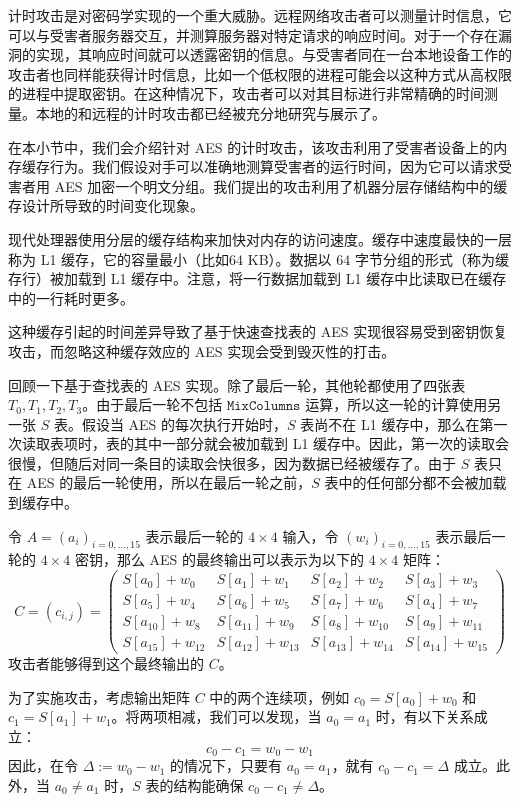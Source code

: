 计时攻击是对密码学实现的一个重大威胁。远程网络攻击者可以测量计时信息，它可以与受害者服务器交互，并测算服务器对特定请求的响应时间。对于一个存在漏洞的实现，其响应时间就可以透露密钥的信息。与受害者同在一台本地设备工作的攻击者也同样能获得计时信息，比如一个低权限的进程可能会以这种方式从高权限的进程中提取密钥。在这种情况下，攻击者可以对其目标进行非常精确的时间测量。本地的和远程的计时攻击都已经被充分地研究与展示了。

在本小节中，我们会介绍针对 AES 的计时攻击，该攻击利用了受害者设备上的内存缓存行为。我们假设对手可以准确地测算受害者的运行时间，因为它可以请求受害者用 AES 加密一个明文分组。我们提出的攻击利用了机器分层存储结构中的缓存设计所导致的时间变化现象。

现代处理器使用分层的缓存结构来加快对内存的访问速度。缓存中速度最快的一层称为 L1 缓存，它的容量最小（比如$64$ KB）。数据以 $64$ 字节分组的形式（称为缓存行）被加载到 L1 缓存中。注意，将一行数据加载到 L1 缓存中比读取已在缓存中的一行耗时更多。

这种缓存引起的时间差异导致了基于快速查找表的 AES 实现很容易受到密钥恢复攻击，而忽略这种缓存效应的 AES 实现会受到毁灭性的打击。

回顾一下基于查找表的 AES 实现。除了最后一轮，其他轮都使用了四张表 $T_0,T_1,T_2,T_3$。由于最后一轮不包括 $\mathtt{MixColumns}$ 运算，所以这一轮的计算使用另一张 $S$ 表。假设当 AES 的每次执行开始时，$S$ 表尚不在 L1 缓存中，那么在第一次读取表项时，表的其中一部分就会被加载到 L1 缓存中。因此，第一次的读取会很慢，但随后对同一条目的读取会快很多，因为数据已经被缓存了。由于 $S$ 表只在 AES 的最后一轮使用，所以在最后一轮之前，$S$ 表中的任何部分都不会被加载到缓存中。

令 $A=(a_i)_{i=0,\dots,15}$ 表示最后一轮的 $4\times4$ 输入，令 $(w_i)_{i=0,...,15}$ 表示最后一轮的 $4\times4$ 密钥，那么 AES 的最终输出可以表示为以下的 $4\times4$ 矩阵：
\begin{equation}\label{eq:4-19}
	C=(c_{i,j})=
	\begin{pmatrix}
		S[a_0]+w_0 & S[a_1]+w_1 & S[a_2]+w_2 & S[a_3]+w_3\\
		S[a_5]+w_4 & S[a_6]+w_5 & S[a_7]+w_6 & S[a_4]+w_7\\
		S[a_{10}]+w_8 & S[a_{11}]+w_9 & S[a_8]+w_{10} & S[a_9]+w_{11}\\
		S[a_{15}]+w_{12} & S[a_{12}]+w_{13} & S[a_{13}]+w_{14} & S[a_{14}]+w_{15}
	\end{pmatrix}
\end{equation}
攻击者能够得到这个最终输出的 $C$。

为了实施攻击，考虑输出矩阵 $C$ 中的两个连续项，例如 $c_0=S[a_0]+w_0$ 和 $c_1=S[a_1]+w_1$。将两项相减，我们可以发现，当 $a_0=a_1$ 时，有以下关系成立：
\[
c_0-c_1=w_0-w_1
\]
因此，在令 $\Delta:=w_0-w_1$ 的情况下，只要有 $a_0=a_1$，就有 $c_0-c_1=\Delta$ 成立。此外，当 $a_0\neq a_1$ 时，$S$ 表的结构能确保 $c_0-c_1\neq\Delta$。

